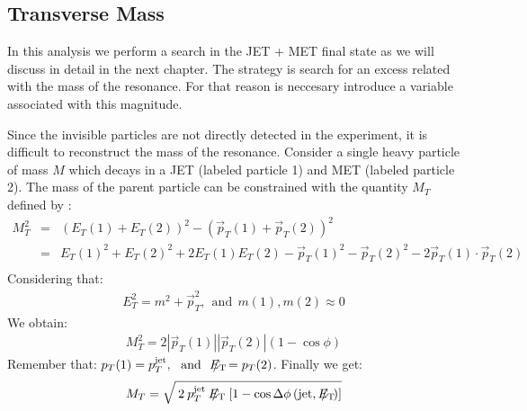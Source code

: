 \subsection{Transverse Mass}\label{transvserve}

In this analysis we perform a search in the JET + MET final state as we will discuss in detail in the next chapter. The strategy is search for an excess related with the mass of the resonance. For that reason is neccesary introduce a variable associated with this magnitude.
  
Since the invisible particles are not directly detected in the experiment, it is difficult to reconstruct the mass of the resonance. Consider a single heavy particle of mass $M$ which decays in a JET (labeled particle 1) and MET (labeled particle 2). The mass of the parent particle can be constrained with the quantity $M_{T}$ defined by \cite{PDG}:
\begin{eqnarray}
M_{T}^{2} &=& (E_{T}(1)+E_{T}(2))^{2}  - (\vec{p}_{T}(1)+\vec{p}_{T}(2))^{2}\nonumber\\
&=& E_{T}(1)^{2} + E_{T}(2)^{2} +2 E_{T}(1)E_{T}(2) -\vec{p}_{T}(1)^{2} - \vec{p}_{T}(2)^{2} -2\vec{p}_{T}(1)\cdot \vec{p}_{T}(2)\nonumber\\
\end{eqnarray}
Considering that:
\begin{eqnarray}
E_{T}^{2} = m^{2}+\vec{p}_{T}^{2},\ \   \text{and}\ \  m(1),m(2) \approx 0
\end{eqnarray}
We obtain:
\begin{eqnarray}
M_{T}^{2} = 2 \left| \vec{p}_{T}(1)\right| \left| \vec{p}_{T}(2)\right| \left(1-\cos\phi \right) 
\end{eqnarray}
Remember that: $p_{T}(1)=p_{T}^{\text{jet}},\ \   \text{and}\ \  \met=p_{T}(2)$.
Finally we get:
\begin{eqnarray}
M_{T} = \sqrt{\:2\: p_{T}^{\text{jet}}\: \met\: \left[ 1-\cos\Delta\phi\left( \text{jet}, \met\right)  \right] } 
\end{eqnarray}


